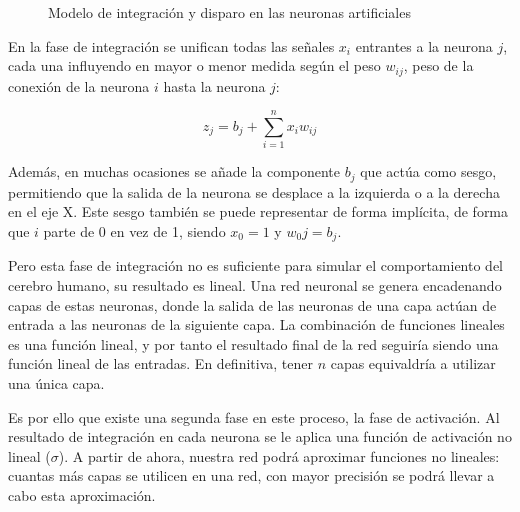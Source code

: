 \begin{figure}[H]
\centering
    \caption{Modelo de integración y disparo en las neuronas artificiales \cite{berzal2018redes}} 
\end{figure}

En la fase de integración se unifican todas las señales $x_i$ entrantes a la neurona $j$, cada una influyendo en mayor o menor medida según el peso $w_{ij}$, peso de la conexión de la neurona $i$ hasta la neurona $j$:

\begin{equation}
    z_j = b_j + \sum_{i=1}^{n} x_iw_{ij}
\end{equation}

Además, en muchas ocasiones se añade la componente $b_j$ que actúa como sesgo, permitiendo que la salida de la neurona se desplace a la izquierda o a la derecha en el eje X. Este sesgo también se puede representar de forma implícita, de forma que $i$ parte de 0 en vez de 1, siendo $x_0 = 1$ y $w_0j = b_j$. \cite{berzal2018redes}

Pero esta fase de integración no es suficiente para simular el comportamiento del cerebro humano, su resultado es lineal. Una red neuronal se genera encadenando capas de estas neuronas, donde la salida de las neuronas de una capa actúan de entrada a las neuronas de la siguiente capa. La combinación de funciones lineales es una función lineal, y por tanto el resultado final de la red seguiría siendo una función lineal de las entradas. En definitiva, tener $n$ capas equivaldría a utilizar una única capa.

Es por ello que existe una segunda fase en este proceso, la fase de activación. Al resultado de integración en cada neurona se le aplica una función de activación no lineal ($\sigma$). A partir de ahora, nuestra red podrá aproximar funciones no lineales: cuantas más capas se utilicen en una red, con mayor precisión se podrá llevar a cabo esta aproximación.

